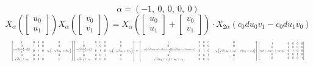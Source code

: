 \documentclass[11pt]{article}
\theoremstyle{definition}
\begin{document}
\[
\alpha = \left( -1, \  0, \  0, \  0, \  0\right)
\]
\[
X_{\alpha}\left(\left[\begin{matrix}u_{0}\\u_{1}\end{matrix}\right]\right) X_{\alpha}\left(\left[\begin{matrix}v_{0}\\v_{1}\end{matrix}\right]\right) = X_{\alpha}\left(\left[\begin{matrix}u_{0}\\u_{1}\end{matrix}\right] + \left[\begin{matrix}v_{0}\\v_{1}\end{matrix}\right]\right) \cdot X_{2\alpha}\left(c_{0} d u_{0} v_{1} - c_{0} d u_{1} v_{0}\right)
\]
\[
\resizebox{\textwidth}{!}{${\left[\begin{matrix}1 & 0 & 0 & 0 & 0\\0 & 1 & 0 & 0 & 0\\\frac{c_{0} \sqrt{d} \left(d u_{1}^{2} - u_{0}^{2}\right)}{2} & 0 & 1 & 0 & c_{0} \left(- \sqrt{d} u_{0} + d u_{1}\right)\\0 & 0 & 0 & 1 & 0\\\sqrt{d} u_{1} + u_{0} & 0 & 0 & 0 & 1\end{matrix}\right]} {\left[\begin{matrix}1 & 0 & 0 & 0 & 0\\0 & 1 & 0 & 0 & 0\\\frac{c_{0} \sqrt{d} \left(d v_{1}^{2} - v_{0}^{2}\right)}{2} & 0 & 1 & 0 & c_{0} \left(- \sqrt{d} v_{0} + d v_{1}\right)\\0 & 0 & 0 & 1 & 0\\\sqrt{d} v_{1} + v_{0} & 0 & 0 & 0 & 1\end{matrix}\right]} = {\left[\begin{matrix}1 & 0 & 0 & 0 & 0\\0 & 1 & 0 & 0 & 0\\- \frac{c_{0} \left(\sqrt{d} \left(u_{0} + v_{0}\right) - d \left(u_{1} + v_{1}\right)\right) \left(\sqrt{d} \left(u_{1} + v_{1}\right) + u_{0} + v_{0}\right)}{2} & 0 & 1 & 0 & - c_{0} \left(\sqrt{d} \left(u_{0} + v_{0}\right) - d \left(u_{1} + v_{1}\right)\right)\\0 & 0 & 0 & 1 & 0\\\sqrt{d} \left(u_{1} + v_{1}\right) + u_{0} + v_{0} & 0 & 0 & 0 & 1\end{matrix}\right]} {\left[\begin{matrix}1 & 0 & 0 & 0 & 0\\0 & 1 & 0 & 0 & 0\\c_{0} d \left(- u_{0} v_{1} + u_{1} v_{0}\right) & 0 & 1 & 0 & 0\\0 & 0 & 0 & 1 & 0\\0 & 0 & 0 & 0 & 1\end{matrix}\right]}$}
\]
\end{document}
